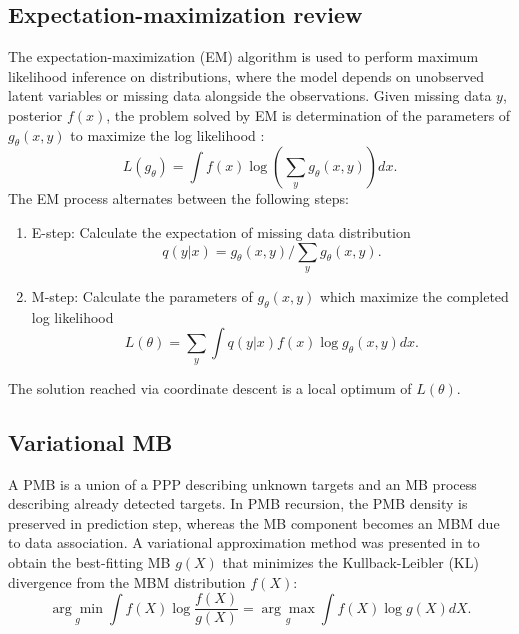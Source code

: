 \subsection{Expectation-maximization review}
The expectation-maximization (EM) algorithm \cite{em} is used to perform maximum likelihood inference on distributions, where the model depends on unobserved latent variables or missing data alongside the observations. Given missing data $y$, posterior $f(x)$, the problem solved by EM is determination of the parameters of $g_{\theta}(x,y)$ to maximize the log likelihood \cite{variational}: 
\begin{equation}
    L(g_{\theta}) = \int f(x)\log(\sum_{y}g_{\theta}(x,y))dx.
\end{equation}
The EM process alternates between the following steps:
\begin{enumerate}
    \item E-step: Calculate the expectation of missing data distribution 
    \begin{equation}
        q(y|x) = g_{\theta}(x,y)/\sum_{y}g_{\theta}(x,y).
    \end{equation}
    \item M-step: Calculate the parameters of $g_{\theta}(x,y)$ which maximize the completed log likelihood
    \begin{equation}
        L(\theta) = \sum_y\int q(y|x)f(x)\log g_{\theta}(x,y)dx.
    \end{equation}
\end{enumerate}
The solution reached via coordinate descent is a local optimum of $L(\theta)$. 


\subsection{Variational MB}
A PMB is a union of a PPP describing unknown targets and an MB process describing already detected targets. In PMB recursion, the PMB density is preserved in prediction step, whereas the MB component becomes an MBM due to data association. A variational approximation method was presented in \cite{variational} to obtain the best-fitting MB $g(X)$ that minimizes the Kullback-Leibler (KL) divergence from the MBM distribution $f(X)$:
\begin{equation}
\underset{g}{\arg\min}\int f(X)\log\frac{f(X)}{g(X)} = \underset{g}{\arg\max}\int f(X)\log g(X)dX.
\label{eq:kl}
\end{equation}


